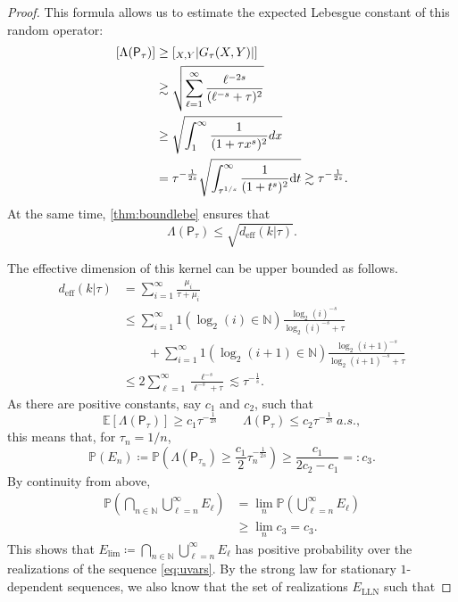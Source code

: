 \documentclass{article}
\let\E\relax
\DeclareMathOperator*{\E}{\mathbb E}
\numberwithin{theorem}{section}
\theoremstyle{definition}
\newcommand{\Prob}{\mathbb P}
\newcommand{\diff}{\text{d}}
\begin{document}
\begin{proof}
    This formula allows us to estimate the expected Lebesgue constant of this random operator:
    \begin{align*}
        \E[\Lambda(\mathsf{P}_{\tau})]&\ge \E\left[\E_{X,Y}|G_\tau(X,Y)|\right]\\
        &\gtrsim \sqrt{\sum_{\ell=1}^\infty \frac{\ell^{-2s}}{(\ell^{-s}+\tau)^2}}\\
        &\ge \sqrt{\int_{1}^\infty \frac{1}{(1+\tau x^s)^2}dx}\\
        &= \tau^{-\frac{1}{2s}}\sqrt{\int_{\tau^{1/s}}^\infty \frac{1}{(1+t^s)^2}\diff t}
        \gtrsim \tau^{-\frac{1}{2s}}.
    \end{align*}
    At the same time, \cref{thm:boundlebe} ensures that
    $$\Lambda(\mathsf{P}_{\tau})\le \sqrt{d_\text{eff}(k|\tau)}.$$

    The effective dimension of this kernel can be upper bounded as follows.
    \begin{align*}
        d_\text{eff}(k|\tau)&=\sum_{i=1}^\infty \frac{\mu_i}{\tau+\mu_i}\\
        &\le \sum_{i=1}^\infty 1(\log_2(i)\in \mathbb N)\frac{\log_2(i)^{-s}}{\log_2(i)^{-s}+\tau}\\
        &\qquad +\sum_{i=1}^\infty 1(\log_2(i+1)\in \mathbb N)\frac{\log_2(i+1)^{-s}}{\log_2(i+1)^{-s}+\tau}\\
        &\le  2\sum_{\ell=1}^\infty \frac{\ell^{-s}}{\ell^{-s}+\tau}\lesssim \tau^{-\frac{1}{s}}.
    \end{align*}
    As there are positive constants, say $c_1$ and $c_2$, such that
    $$\mathbb E[\Lambda(\mathsf{P}_{\tau})]\ge c_1\tau^{-\frac{1}{2s}}\qquad \Lambda(\mathsf{P}_{\tau})\le c_2\tau^{-\frac{1}{2s}}\ a.s.,$$
    this means that, for $\tau_n=1/n$,
    $$\Prob(E_n)\coloneqq\Prob\left(\Lambda(\mathsf{P}_{\tau_n})\ge \frac{c_1}{2}\tau_n^{-\frac{1}{2s}}\right)\ge \frac{c_1}{2c_2-c_1}=:c_3.$$
    By continuity from above,
    \begin{align*}
        \Prob\left(\bigcap_{n\in \mathbb N}\bigcup_{\ell=n}^\infty E_{\ell}\right) &= \lim_n\Prob\left(\bigcup_{\ell=n}^\infty E_{\ell}\right)\\
        &\ge \lim_n c_3 = c_3.
    \end{align*}
    This shows that $E_\text{lim}\coloneqq\bigcap_{n\in \mathbb N}\bigcup_{\ell=n}^\infty E_{\ell}$ has positive probability over the realizations of the sequence \eqref{eq:uvars}. By the strong law for stationary $1$-dependent sequences, we also know that the set of realizations $E_\text{LLN}$ such that

\end{proof}
\end{document}
